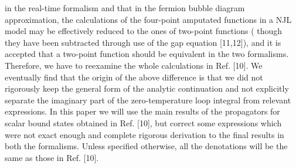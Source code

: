 \documentclass[twocolumn,prd,showpacs,a4paper]{revtex4}
\begin{document}
in the real-time formalism and that in the fermion bubble diagram approximation, the 
calculations of the four-point amputated functions in a NJL model may be effectively 
reduced to the ones of two-point functions ( though they have been subtracted through 
use of the gap equation [11,12]), and it is accepted that a two-point function should 
be equivalent in the two formalisms. Therefore, we have to reexamine the whole 
calculations in Ref. [10]. We eventually find that the origin of the above difference 
is that we did not rigorously keep the general form of the analytic continuation and 
not explicitly separate the imaginary part of the zero-temperature loop integral from 
relevant expressions. In this paper we will use the main results of the propagators 
for scalar bound states obtained in Ref. [10], but correct some expressions which 
were not exact enough and complete rigorous derivation to the final results in both 
the formalisms. Unless specified otherwise, all the denotations will be the same as 
those in Ref. [10]. 
\end{document}
